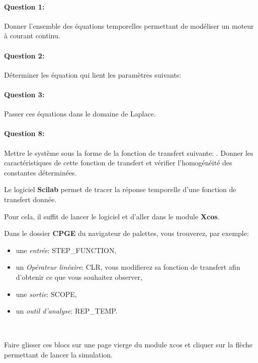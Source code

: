 \paragraph{Question 1:} Donner l'ensemble des équations temporelles permettant de modéliser un moteur à courant continu.

\paragraph{Question 2:} Déterminer les équation qui lient les paramètres suivants:
\begin{itemize}
 \grandeurs
\end{itemize}

\paragraph{Question 3:} Passer ces équations dans le domaine de Laplace.

\paragraph{Question 8:} Mettre le système sous la forme de la fonction de transfert suivante: \fonctiontransfert. Donner les caractéristiques de cette fonction de transfert et vérifier l'homogénéité des constantes déterminées.


Le logiciel \textbf{Scilab} permet de tracer la réponse temporelle d'une fonction de transfert donnée.

Pour cela, il suffit de lancer le logiciel et d'aller dans le module \textbf{Xcos}.

Dans le dossier \textbf{CPGE} du navigateur de palettes, vous trouverez, par exemple:
\begin{itemize}
 \item une \textit{entrée}: STEP\_FUNCTION,
 \item un \textit{Opérateur linéaire}: CLR, vous modifierez sa fonction de transfert afin d'obtenir ce que vous souhaitez observer,
 \item une \textit{sortie}: SCOPE,
 \item un \textit{outil d'analyse}: REP\_TEMP.
\end{itemize}

~\

Faire glisser ces blocs sur une page vierge du module xcos et cliquer sur la flèche permettant de lancer la simulation.

